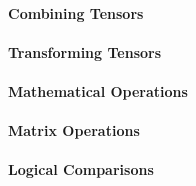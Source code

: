         \paragraph{Combining Tensors}
          
        \paragraph{Transforming Tensors}
        \paragraph{Mathematical Operations}
        \paragraph{Matrix Operations}
        \paragraph{Logical Comparisons}
